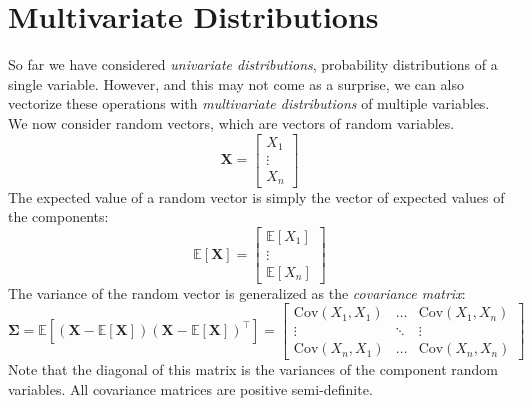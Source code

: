 \documentclass{article}
\begin{document}
\section{Multivariate Distributions}
So far we have considered \textit{univariate distributions}, probability distributions of a single variable. However, and this may not come as a surprise, we can also vectorize these operations with \textit{multivariate distributions} of multiple variables. We now consider random vectors, which are vectors of random variables. $$\mathbf{X} = \begin{bmatrix} X_1 \\ \vdots \\ X_n \end{bmatrix}$$
The expected value of a random vector is simply the vector of expected values of the components: $$\mathbb{E}[\mathbf{X}] = \begin{bmatrix} \mathbb{E}[X_1] \\ \vdots \\ \mathbb{E}[X_n] \end{bmatrix}$$
The variance of the random vector is generalized as the \textit{covariance matrix}:
$$\mathbf{\Sigma} = \mathbb{E}[(\mathbf{X} - \mathbb{E}[\mathbf{X}])(\mathbf{X} - \mathbb{E}[\mathbf{X}])^\top] = 
\begin{bmatrix}
\text{Cov}(X_1, X_1) & \hdots & \text{Cov}(X_1, X_n) \\
\vdots & \ddots & \vdots \\
\text{Cov}(X_n, X_1) & \hdots & \text{Cov}(X_n, X_n)
\end{bmatrix}
$$
Note that the diagonal of this matrix is the variances of the component random variables. All covariance matrices are positive semi-definite.

\clearpage
\end{document}
